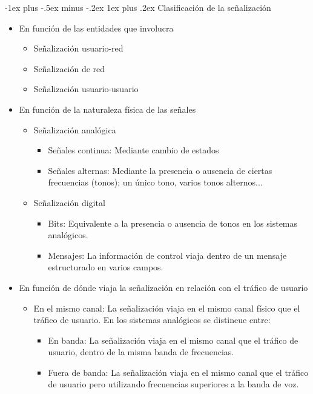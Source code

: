 \documentclass[10pt,portrait, twocolumn]{article}
\makeatletter
\renewcommand{\subsubsection}{\@startsection{subsubsection}{3}{0mm}%
                                {-1ex plus -.5ex minus -.2ex}%
                                {1ex plus .2ex}%
                                {\normalfont\small\bfseries}}
\makeatother
\begin{document}
\subsubsection{Clasificación de la señalización}

\begin{itemize}
\item En función de las entidades que involucra
	\begin{itemize}
	\item Señalización usuario-red
	\item Señalización de red
	\item Señalización usuario-usuario
	\end{itemize}
\item En función de la naturaleza física de las señales
	\begin{itemize}
	\item Señalización analógica
		\begin{itemize}
		\item Señales continua: Mediante cambio de estados
		\item Señales alternas: Mediante la presencia o ausencia de ciertas frecuencias (tonos); un único tono, varios tonos alternos...
		\end{itemize}
	\item Señalización digital
		\begin{itemize}
		\item Bits: Equivalente a la presencia o ausencia de tonos en los sistemas analógicos.
		\item Mensajes: La información de control viaja dentro de un mensaje estructurado en varios campos.
		\end{itemize}
	\end{itemize}
\item En función de dónde viaja la señalización en relación con el tráfico de usuario
	\begin{itemize}
	\item En el mismo canal: La señalización viaja en el mismo canal físico que el tráfico de usuario. En los sistemas analógicos se distineue entre:
		\begin{itemize}
		\item En banda: La señalización viaja en el mismo canal que el tráfico de usuario, dentro de la misma banda de frecuencias.
		\item Fuera de banda: La señalización viaja en el mismo canal que el tráfico de usuario pero utilizando frecuencias superiores a la banda de voz.

\end{itemize}
\end{itemize}
\end{itemize}
\end{document}
